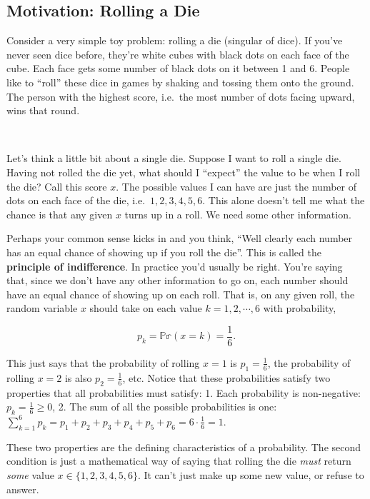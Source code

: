 \documentclass[
  letterpaper,
  DIV=11,
  numbers=noendperiod]{scrreprt}
\begin{document}
\hypertarget{motivation-rolling-a-die}{%
\subsection{Motivation: Rolling a Die}\label{motivation-rolling-a-die}}

Consider a very simple toy problem: rolling a die (singular of dice). If
you've never seen dice before, they're white cubes with black dots on
each face of the cube. Each face gets some number of black dots on it
between 1 and 6. People like to ``roll'' these dice in games by shaking
and tossing them onto the ground. The person with the highest score,
i.e.~the most number of dots facing upward, wins that round.

{🎲}

Let's think a little bit about a single die. Suppose I want to roll a
single die. Having not rolled the die yet, what should I ``expect'' the
value to be when I roll the die? Call this score \(x\). The possible
values I can have are just the number of dots on each face of the die,
i.e.~\(1,2,3,4,5,6\). This alone doesn't tell me what the chance is that
any given \(x\) turns up in a roll. We need some other information.

Perhaps your common sense kicks in and you think, ``Well clearly each
number has an equal chance of showing up if you roll the die''. This is
called the \textbf{principle of indifference}. In practice you'd usually
be right. You're saying that, since we don't have any other information
to go on, each number should have an equal chance of showing up on each
roll. That is, on any given roll, the random variable \(x\) should take
on each value \(k=1,2,\cdots,6\) with probability,

\[p_k = \mathbb{Pr}(x=k) = \frac{1}{6}.\]

This just says that the probability of rolling \(x=1\) is
\(p_1 = \frac{1}{6}\), the probability of rolling \(x=2\) is also
\(p_2 = \frac{1}{6}\), etc. Notice that these probabilities satisfy two
properties that all probabilities must satisfy: 1. Each probability is
non-negative: \(p_k = \frac{1}{6} \geq 0\), 2. The sum of all the
possible probabilities is one:
\(\sum_{k=1}^6 p_k = p_1 + p_2 + p_3 + p_4 + p_5 + p_6 = 6 \cdot \frac{1}{6} = 1\).

These two properties are the defining characteristics of a probability.
The second condition is just a mathematical way of saying that rolling
the die \emph{must} return \emph{some} value \(x \in \{1,2,3,4,5,6\}\).
It can't just make up some new value, or refuse to answer.
\end{document}
